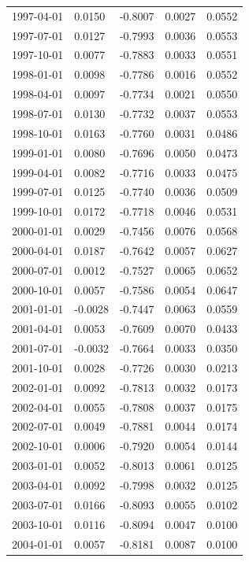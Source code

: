 \begin{longtable}{p{}|p{}p{}p{}p{}}
        1997-04-01	&0.0150	&-0.8007	&0.0027	&0.0552\\
        1997-07-01	&0.0127	&-0.7993	&0.0036	&0.0553\\
        1997-10-01	&0.0077	&-0.7883	&0.0033	&0.0551\\
        1998-01-01	&0.0098	&-0.7786	&0.0016	&0.0552\\
        1998-04-01	&0.0097	&-0.7734	&0.0021	&0.0550\\
        1998-07-01	&0.0130	&-0.7732	&0.0037	&0.0553\\
        1998-10-01	&0.0163	&-0.7760	&0.0031	&0.0486\\
        1999-01-01	&0.0080	&-0.7696	&0.0050	&0.0473\\
        1999-04-01	&0.0082	&-0.7716	&0.0033	&0.0475\\
        1999-07-01	&0.0125	&-0.7740	&0.0036	&0.0509\\
        1999-10-01	&0.0172	&-0.7718	&0.0046	&0.0531\\
        2000-01-01	&0.0029	&-0.7456	&0.0076	&0.0568\\
        2000-04-01	&0.0187	&-0.7642	&0.0057	&0.0627\\
        2000-07-01	&0.0012	&-0.7527	&0.0065	&0.0652\\
        2000-10-01	&0.0057	&-0.7586	&0.0054	&0.0647\\
        2001-01-01	&-0.0028	&-0.7447	&0.0063	&0.0559\\
        2001-04-01	&0.0053	&-0.7609	&0.0070	&0.0433\\
        2001-07-01	&-0.0032	&-0.7664	&0.0033	&0.0350\\
        2001-10-01	&0.0028	&-0.7726	&0.0030	&0.0213\\
        2002-01-01	&0.0092	&-0.7813	&0.0032	&0.0173\\
        2002-04-01	&0.0055	&-0.7808	&0.0037	&0.0175\\
        2002-07-01	&0.0049	&-0.7881	&0.0044	&0.0174\\
        2002-10-01	&0.0006	&-0.7920	&0.0054	&0.0144\\
        2003-01-01	&0.0052	&-0.8013	&0.0061	&0.0125\\
        2003-04-01	&0.0092	&-0.7998	&0.0032	&0.0125\\
        2003-07-01	&0.0166	&-0.8093	&0.0055	&0.0102\\
        2003-10-01	&0.0116	&-0.8094	&0.0047	&0.0100\\
        2004-01-01	&0.0057	&-0.8181	&0.0087	&0.0100\\

\end{longtable}
